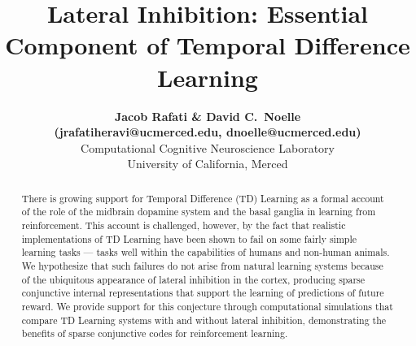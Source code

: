 \documentclass[preprint,12pt,authoryear]{elsarticle}
\begin{document}
\begin{frontmatter}



\title{Lateral Inhibition: Essential Component of Temporal Difference Learning}


\author{{\large \bf Jacob Rafati \& David C.~Noelle} \\
        {\large \bf (jrafatiheravi@ucmerced.edu, dnoelle@ucmerced.edu)} \\
        Computational Cognitive Neuroscience Laboratory \\
        University of California, Merced}

\address{5200 North Lake Road \\
        Merced, CA 95343 USA}

\begin{abstract}
There is growing support for Temporal Difference (TD) Learning as a
formal account of the role of the midbrain dopamine system and the
basal ganglia in learning from reinforcement. This account is
challenged, however, by the fact that realistic implementations of TD
Learning have been shown to fail on some fairly simple learning tasks
--- tasks well within the capabilities of humans and non-human
animals. We hypothesize that such failures do not arise from natural
learning systems because of the ubiquitous appearance of lateral
inhibition in the cortex, producing sparse conjunctive internal
representations that support the learning of predictions of future
reward. We provide support for this conjecture through computational
simulations that compare TD Learning systems with and without lateral
inhibition, demonstrating the benefits of sparse conjunctive codes for
reinforcement learning.
\end{abstract}


\end{frontmatter}
\end{document}
